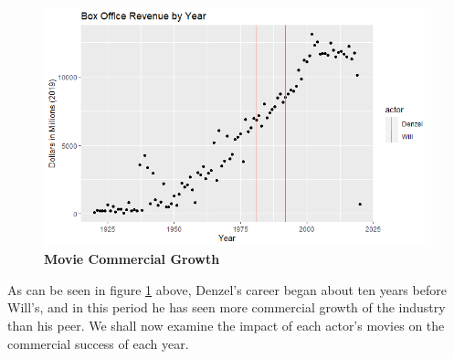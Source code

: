 \documentclass[]{article}
\begin{document}
\begin{figure}
  \includegraphics[clip,scale=0.5]{plots/revenue_by_year.png}
  \caption{\textbf{Movie Commercial Growth}}
  \label{fig:yearly-rev}
\end{figure}

As can be seen in figure \ref{fig:yearly-rev} above, Denzel's career
began about ten years before Will's, and in this period he has seen more
commercial growth of the industry than his peer. We shall now examine
the impact of each actor's movies on the commercial success of each
year.
\end{document}
